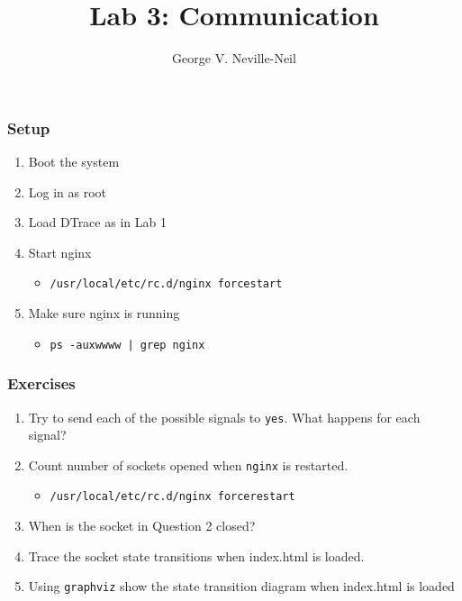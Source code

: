 \documentclass[pdftex]{beamer}
\begin{document}

\title{Lab 3: Communication}
\author[shortname]{George V. Neville-Neil}

\begin{frame}[fragile]
  \frametitle{Setup}
  \begin{enumerate}
  \item Boot the system
  \item Log in as root
  \item Load DTrace as in Lab 1
  \item Start nginx
    \begin{itemize}
    \item \verb|/usr/local/etc/rc.d/nginx forcestart|
    \end{itemize}
  \item Make sure nginx is running
    \begin{itemize}
    \item \verb+ps -auxwwww | grep nginx+
    \end{itemize}
  \end{enumerate}
\end{frame}

\begin{frame}[fragile]
  \frametitle{Exercises}
  \begin{enumerate}
  \item Try to send each of the possible signals to \verb|yes|.  What happens
    for each signal?
  \item Count number of sockets opened when \verb|nginx| is restarted.
    \begin{itemize}
    \item \verb|/usr/local/etc/rc.d/nginx forcerestart|
    \end{itemize}
  \item When is the socket in Question 2 closed?
  \item Trace the socket state transitions when index.html is loaded.
  \item Using \texttt{graphviz} show the state transition diagram when
    index.html is loaded
  \end{enumerate}
\end{frame}
\end{document}

